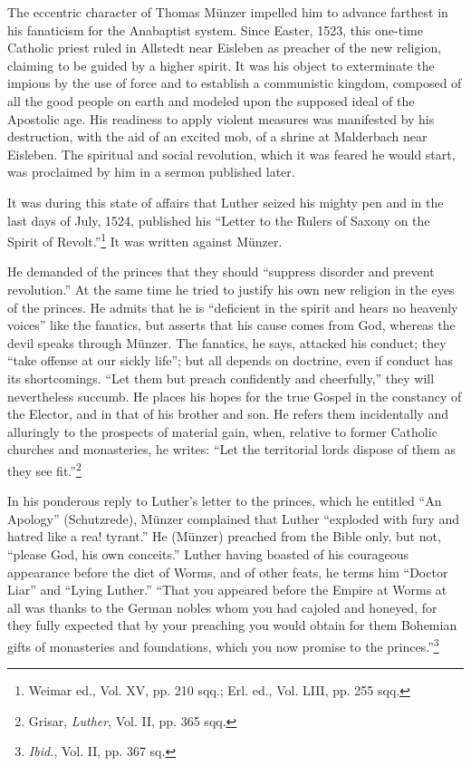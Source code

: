 The eccentric character of Thomas Münzer impelled him to advance
farthest in his fanaticism for the Anabaptist system. Since Easter, 1523,
this one-time Catholic priest ruled in Allstedt near Eisleben as preacher
of the new religion, claiming to be guided by a higher spirit. It was his
object to exterminate the impious by the use of force and to establish
a communistic kingdom, composed of all the good people on earth and
modeled upon the supposed ideal of the Apostolic age. His readiness to
apply violent measures was manifested by his destruction, with the aid
of an excited mob, of a shrine at Malderbach near Eisleben. The spiritual
and social revolution, which it was feared he would start, was proclaimed
by him in a sermon published later.

It was during this state of affairs that Luther seized his mighty pen
and in the last days of July, 1524, published his “Letter to the Rulers
of Saxony on the Spirit of Revolt.”\footnote
{Weimar ed., Vol. XV, pp. 210 sqq.; Erl. ed., Vol. LIII, pp. 255 sqq.}
It was written against Münzer.

He demanded of the princes that they should “suppress disorder and
prevent revolution.” At the same time he tried to justify his own new
religion in the eyes of the princes. He admits that he is “deficient in the spirit
and hears no heavenly voices” like the fanatics, but asserts that his cause
comes from God, whereas the devil speaks through Münzer. The fanatics, he
says, attacked his conduct; they “take offense at our sickly life”; but all
depends on doctrine, even if conduct has its shortcomings. “Let them but
preach confidently and cheerfully,” they will nevertheless succumb. He places
his hopes for the true Gospel in the constancy of the Elector, and in that
of his brother and son. He refers them incidentally and alluringly to the
prospects of material gain, when, relative to former Catholic churches and
monasteries, he writes: ``Let the territorial lords dispose of them as they see
fit.''\footnote{Grisar, \textit{Luther}, Vol. II, pp. 365 sqq.}

In his ponderous reply to Luther’s letter to the princes, which he
entitled “An Apology” (Schutzrede), Münzer complained that Luther
“exploded with fury and hatred like a rea! tyrant.” He (Münzer)
preached from the Bible only, but not, “please God, his own conceits.”
Luther having boasted of his courageous appearance before the diet
of Worms, and of other feats, he terms him “Doctor Liar” and “Lying
Luther.” “That you appeared before the Empire at Worms at all was
thanks to the German nobles whom you had cajoled and honeyed,
for they fully expected that by your preaching you would obtain
for them Bohemian gifts of monasteries and foundations, which you
now promise to the princes.”\footnote{\textit{Ibid.}, Vol. II, pp. 367 sq.}

